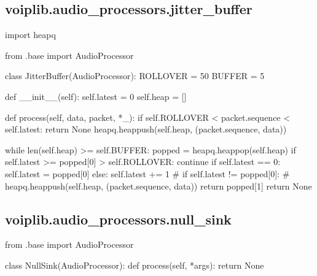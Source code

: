 \subsection{voiplib.audio\_processors.jitter\_buffer}
\begin{pythoncode}
import heapq

from .base import AudioProcessor


class JitterBuffer(AudioProcessor):
    ROLLOVER = 50
    BUFFER = 5

    def __init__(self):
        self.latest = 0
        self.heap = []

    def process(self, data, packet, *_):
        if self.ROLLOVER < packet.sequence < self.latest:
            return None
        heapq.heappush(self.heap, (packet.sequence, data))

        while len(self.heap) >= self.BUFFER:
            popped = heapq.heappop(self.heap)
            if self.latest >= popped[0] > self.ROLLOVER:
                continue
            if self.latest == 0:
                self.latest = popped[0]
            else:
                self.latest += 1
            # if self.latest != popped[0]:
            #    heapq.heappush(self.heap, (packet.sequence, data))
            return popped[1]
        return None
\end{pythoncode}
\subsection{voiplib.audio\_processors.null\_sink}
\begin{pythoncode}
from .base import AudioProcessor


class NullSink(AudioProcessor):
    def process(self, *args):
        return None
\end{pythoncode}
